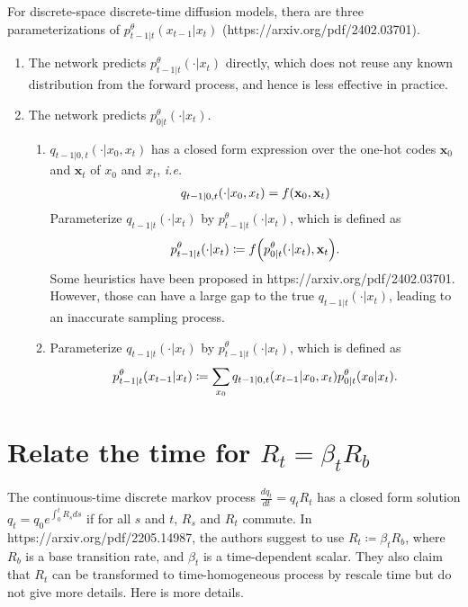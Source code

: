 \documentclass[10pt]{article}
\begin{document}
For discrete-space discrete-time diffusion models, thera are three parameterizations of $p^\theta_{t-1|t}(x_{t-1}|x_t)$ (https://arxiv.org/pdf/2402.03701).
\begin{enumerate}
  \item The network predicts $p^\theta_{t-1|t}(\cdot|x_t)$ directly, which does not reuse any known distribution from the forward process, and hence is less effective in practice.
  \item The network predicts $p^\theta_{0|t}(\cdot|x_t)$.
  \begin{enumerate}
    \item $q_{t-1|0, t}(\cdot|x_0, x_t)$ has a closed form expression over the one-hot codes $\mathbf{x}_0$ and $\mathbf{x}_t$ of $x_0$ and $x_t$, {\it i.e.}
    \begin{eqnarray*}
      q_{t-1|0, t}(\cdot|x_0, x_t)=f\qty(\mathbf{x}_0, \mathbf{x}_t) 
    \end{eqnarray*}
    Parameterize $q_{t-1|t}(\cdot|x_t)$ by $p^\theta_{t-1|t}(\cdot|x_t)$, which is defined as
    \begin{eqnarray*}
      p^\theta_{t-1|t}(\cdot|x_t)\coloneq f\qty(p^\theta_{0|t}(\cdot|x_t), \mathbf{x}_t).
    \end{eqnarray*}
    Some heuristics have been proposed in https://arxiv.org/pdf/2402.03701. However, those can have a large gap to the true $q_{t-1|t}(\cdot|x_t)$, leading to an inaccurate sampling process.
    \item Parameterize $q_{t-1|t}(\cdot|x_t)$ by $p^\theta_{t-1|t}(\cdot|x_t)$, which is defined as
    \begin{eqnarray*}
      p^\theta_{t-1|t}(x_{t-1}|x_t)\coloneq \sum_{x_0}q_{t-1|0,t}\qty(x_{t-1}|x_0,x_t)p^\theta_{0|t}(x_0|x_t).
    \end{eqnarray*}
  \end{enumerate}
\end{enumerate}

\section{Relate the time for $R_t=\beta_t R_b$}

The continuous-time discrete markov process $\frac{d q_t}{dt}=q_t R_t$ has a closed form solution $q_t = q_0 e^{\int_0^t R_s ds}$ if for all $s$ and $t$, $R_s$ and $R_t$ commute. In https://arxiv.org/pdf/2205.14987, the authors suggest to use $R_t\coloneqq \beta_t R_b$, where $R_b$ is a base transition rate, and $\beta_t$ is a time-dependent scalar. They also claim that $R_t$ can be transformed to time-homogeneous process by rescale time but do not give more details. Here is more details.
\end{document}
